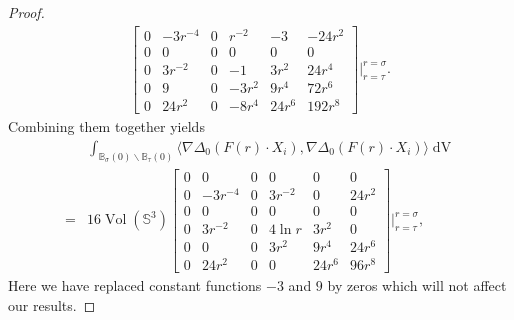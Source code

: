 \documentclass[10pt,a4paper]{amsart}
\DeclareMathOperator{\Vol}{Vol}
\DeclareMathOperator{\dvol}{dV}
\newcommand{\bB}{\mathbb{B}}
\newcommand{\bS}{\mathbb{S}}
\begin{document}
\begin{proof}
\begin{equation}
\begin{split}
\begin{bmatrix}
0 & -3r^{-4} & 0 & r^{-2} & -3& -24r^2\\
0 & 0 & 0& 0& 0 & 0\\
0 & 3r^{-2} & 0 & -1 & 3r^2& 24r^4\\
0 & 9 & 0 & -3r^2 & 9r^4& 72r^6\\
0 & 24r^2 & 0 & -8r^4 & 24r^6& 192r^8
\end{bmatrix}\Big|_{r=\tau}^{r=\sigma}.
    \end{split}
\end{equation}
Combining them together yields
\begin{equation}
\begin{split}
    &\int_{\bB_{\sigma}(0)\backslash \bB_{\tau}(0)}\langle \nabla \Delta_0 (F(r)\cdot X_i), \nabla \Delta_0(F(r)\cdot X_i)\rangle \dvol\\
    =&16 \Vol(\bS^3) \begin{bmatrix}
0 & 0 & 0 & 0 & 0& 0\\
0 & -3r^{-4} & 0 & 3r^{-2} & 0& 24r^2\\
0 & 0 & 0& 0& 0 & 0\\
0 & 3r^{-2} & 0 & {4\ln r} & 3r^2& 0\\
0 & 0 & 0 & 3r^2 & 9r^4& 24r^6\\
0 & 24r^2 & 0 & 0 & 24r^6& 96r^8
\end{bmatrix}\Big|_{r=\tau}^{r=\sigma},
\end{split}
\end{equation}
Here we have replaced constant functions $-3$ and $9$ by zeros which will not affect our results.
\end{proof}
\end{document}
